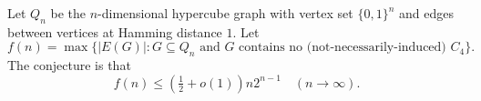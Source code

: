 Let $Q_n$ be the $n$-dimensional hypercube graph with vertex set $\{0,1\}^n$ and edges between
vertices at Hamming distance $1$. Let
\[f(n)=\max\{|E(G)|: G\subseteq Q_n\text{ and }G\text{ contains no (not-necessarily-induced) }C_4\}.\]
The conjecture is that
\[f(n)\le \left(\tfrac12+o(1)\right)n2^{n-1} \quad (n\to\infty).\]
